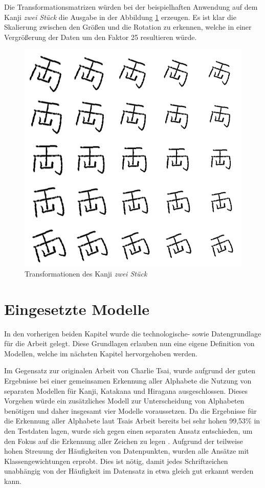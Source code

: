 \documentclass[twoside,a4paper]{IEEEtran}
\begin{document}
Die Transformationsmatrizen würden bei der beispielhaften Anwendung auf dem Kanji \textit{zwei Stück} die Ausgabe in der Abbildung \ref{rot} erzeugen. Es ist klar die Skalierung zwischen den Größen und die Rotation zu erkennen, welche in einer Vergrößerung der Daten um den Faktor 25 resultieren würde.
\begin{figure}[!htb]
	\includegraphics[width=\columnwidth]{rot_scale}
	\caption{Transformationen des Kanji \textit{zwei Stück}}
	\label{rot}
\end{figure}
\section{Eingesetzte Modelle}
In den vorherigen beiden Kapitel wurde die technologische- sowie Datengrundlage für die Arbeit gelegt. Diese Grundlagen erlauben nun eine eigene Definition von Modellen, welche im nächsten Kapitel hervorgehoben werden. 

Im Gegensatz zur originalen Arbeit von Charlie Tsai, wurde aufgrund der guten Ergebnisse bei einer gemeinsamen Erkennung aller Alphabete die Nutzung von separaten Modellen für Kanji, Katakana und Hiragana ausgeschlossen. Dieses Vorgehen würde ein zusätzliches Modell zur Unterscheidung von Alphabeten benötigen und daher insgesamt vier Modelle voraussetzen. Da die Ergebnisse für die Erkennung aller Alphabete laut Tsais Arbeit bereits bei sehr hohen 99,53\% in den Testdaten lagen, wurde sich gegen einen separaten Ansatz entschieden, um den Fokus auf die Erkennung aller Zeichen zu legen \cite[S.4-6]{RHC}. Aufgrund der teilweise hohen Streuung der Häufigkeiten von Datenpunkten, wurden alle Ansätze mit Klassengewichtungen erprobt. Dies ist nötig, damit jedes Schriftzeichen unabhängig von der Häufigkeit im Datensatz in etwa gleich gut erkannt werden kann.
\end{document}

